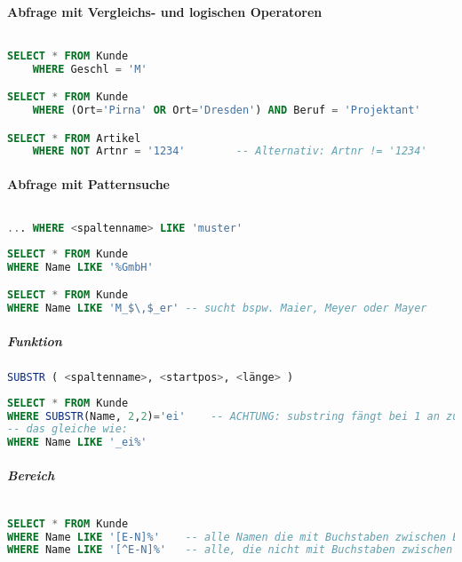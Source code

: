 \paragraph{Abfrage mit Vergleichs- und logischen Operatoren} $ $
\begin{lstlisting}[language=SQL]
SELECT * FROM Kunde 
	WHERE Geschl = 'M'

SELECT * FROM Kunde 
	WHERE (Ort='Pirna' OR Ort='Dresden') AND Beruf = 'Projektant'

SELECT * FROM Artikel
	WHERE NOT Artnr = '1234'		-- Alternativ: Artnr != '1234'
\end{lstlisting}

\paragraph{Abfrage mit Patternsuche}$ $
\begin{lstlisting}[language=SQL]
... WHERE <spaltenname> LIKE 'muster'
\end{lstlisting}
\begin{lstlisting}[language=SQL]
SELECT * FROM Kunde
WHERE Name LIKE '%GmbH'

SELECT * FROM Kunde
WHERE Name LIKE 'M_$\,$_er' -- sucht bspw. Maier, Meyer oder Mayer
\end{lstlisting}

\subparagraph{Funktion}
\begin{lstlisting}[language=SQL]
SUBSTR ( <spaltenname>, <startpos>, <länge> )
\end{lstlisting}
\begin{lstlisting}[language=SQL]
SELECT * FROM Kunde 
WHERE SUBSTR(Name, 2,2)='ei'	-- ACHTUNG: substring fängt bei 1 an zu zählen: 1. Zeichen ist nicht an der Stelle 0, sondern tatsächlich 1
-- das gleiche wie:
WHERE Name LIKE '_ei%'
\end{lstlisting}
\subparagraph{Bereich}$ $
\begin{lstlisting}[language=SQL]
SELECT * FROM Kunde 
WHERE Name LIKE '[E-N]%'	-- alle Namen die mit Buchstaben zwischen E und N beginnen
WHERE Name LIKE '[^E-N]%'	-- alle, die nicht mit Buchstaben zwischen E und N beginnen
\end{lstlisting}

